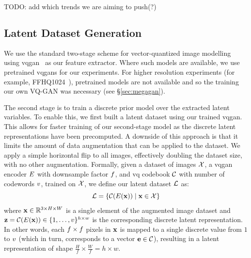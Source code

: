 

TODO: add which trends we are aiming to push(?)

\subsection{Latent Dataset Generation}
\label{subsec:datasetGen}

We use the standard two-stage scheme for vector-quantized image
modelling~\cite{oord2018neural,razavi2019generating,esser2021taming,bondtaylor2021unleashing}
using \gls{vqgan}~\cite{esser2021taming} as our feature extractor. Where such models
are available, we use pretrained \glspl{vqgan} for our experiments. For higher
resolution experiments (for example, FFHQ1024~\cite{karras2019stylebased}),
pretrained models are not available and so the training our own VQ-GAN was necessary
(see \S\ref{sec:megagan}).

The second stage is to train a discrete prior model over the extracted latent variables.
To enable this, we first built a latent dataset using our trained \gls{vqgan}.
This allows for faster training of our second-stage model as the discrete latent
representations have been precomputed. A downside of this approach is that it
limits the amount of data augmentation that can be applied to the dataset. We
apply a simple horizontal flip to all images, effectively doubling the dataset
size, with no other augmentation. Formally, given a dataset of images
$\mathcal{X}$, a \gls{vqgan} encoder $E$ with downsample factor
$f$, and \gls{vq} codebook $\mathcal{C}$ with
number of codewords $v$, trained on $\mathcal{X}$, we define our
latent dataset $\mathcal{L}$ as:
\begin{equation}
    \mathcal{L} = \{\mathcal{C}(E(\mathbf{x})) \mid \mathbf{x} \in \mathcal{X} \}
\end{equation}
where $\mathbf{x} \in \mathbb{R}^{3 \times H \times W}$ is a single element of the
augmented image
dataset and $\mathbf{z} = \mathcal{C}(E(\mathbf{x})) \in \{1, \dots,
v\}^{h \times w}$ is the corresponding discrete latent
representation. In other words, each $f \times f$
pixels in $\mathbf{x}$ is mapped to a single discrete value from $1$ to
$v$ (which in turn, corresponds to a vector $\mathbf{e} \in
\mathcal{C}$),
resulting in a latent representation of shape $\frac{H}{f} \times \frac{W}{f} =
h \times w$.

